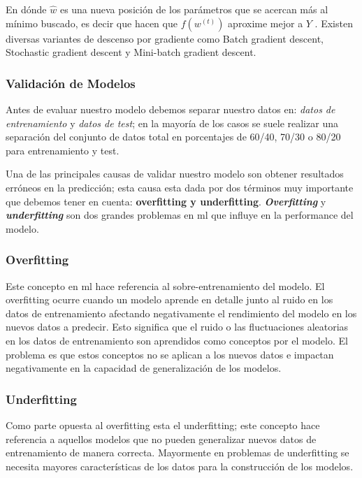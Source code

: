 En dónde $\hat{w}$ es una nueva posición de los parámetros que se acercan más al mínimo buscado, es decir que hacen que $f(w^{(t)})$ aproxime mejor a $Y$ . Existen diversas variantes de descenso por gradiente como Batch gradient descent, Stochastic gradient descent y Mini-batch gradient descent.


\subsubsection{Validación de Modelos}\label{sub:validacion-modelo}

Antes de evaluar nuestro modelo debemos separar nuestro datos en: \textit{datos de entrenamiento} y \textit{datos de test}; en la mayoría de los casos se suele realizar una separación del conjunto de datos total en porcentajes de 60/40, 70/30 o 80/20 para entrenamiento y test.

Una de las principales causas de validar nuestro modelo son obtener resultados erróneos en la predicción; esta causa esta dada por dos términos muy importante que debemos tener en cuenta: \textbf{overfitting y underfitting}. \textit{\textbf{Overfitting}} y \textit{\textbf{underfitting}} son dos grandes problemas en \ac{ml} que influye en la performance del modelo. 

\subsubsection*{Overfitting}
Este concepto en \ac{ml} hace referencia al sobre-entrenamiento del modelo. El overfitting ocurre cuando un modelo aprende en detalle junto al ruido en los datos de entrenamiento afectando negativamente el rendimiento del modelo en los nuevos datos a predecir. Esto significa que el ruido o las fluctuaciones aleatorias en los datos de entrenamiento son aprendidos como conceptos por el modelo. El problema es que estos conceptos no se aplican a los nuevos datos e impactan negativamente en la capacidad de generalización de los modelos.

\subsubsection*{Underfitting}
Como parte opuesta al overfitting esta el  underfitting; este concepto hace referencia a aquellos modelos que no pueden generalizar nuevos datos de entrenamiento de manera correcta. Mayormente en problemas de underfitting se necesita mayores características de los datos para la construcción de los modelos.

